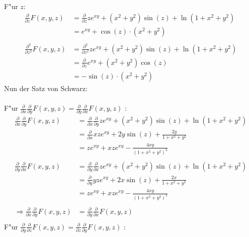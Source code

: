 \documentclass{theozettel}
\begin{document}
F"ur $z$:\\
\begin{align*}
\frac{\partial}{\partial z}F\left(x,y,z\right) &=\frac{\partial}{\partial z}ze^{xy}+\left(x^2+y^2\right)\sin\left(z\right)+\ln\left(1+x^2+y^2\right)\\
&=e^{xy}+\cos\left(z\right)\cdot\left(x^2+y^2\right)\\\\
\frac{\partial^2}{\partial z^2}F\left(x,y,z\right) &=\frac{\partial^2}{\partial z^2}ze^{xy}+\left(x^2+y^2\right)\sin\left(z\right)+\ln\left(1+x^2+y^2\right)\\
&=\frac{\partial}{\partial z}e^{xy}+\left(x^2+y^2\right)\cos\left(z\right)\\
&= -\sin\left(z\right) \cdot \left(x^2+y^2\right)
\end{align*}
Nun der Satz von Schwarz:\\\\
F"ur $\frac{\partial}{\partial x}\frac{\partial}{\partial y}F\left(x,y,z\right) =\frac{\partial}{\partial y}\frac{\partial}{\partial x}F\left(x,y,z\right)$ :
\begin{align*}
\frac{\partial}{\partial x}\frac{\partial}{\partial y}F\left(x,y,z\right) &= \frac{\partial}{\partial x}\frac{\partial}{\partial y}ze^{xy}+\left(x^2+y^2\right)\sin\left(z\right)+\ln\left(1+x^2+y^2\right)\\
&=\frac{\partial}{\partial x}xze^{xy}+2y\sin\left(z\right)+\frac{2y}{1+x^2+y^2}\\
&= ze^{xy}+xze^{xy}-\frac{4xy}{\left(1+x^2+y^2\right)^2}\\\\
\frac{\partial}{\partial y}\frac{\partial}{\partial x}F\left(x,y,z\right) &= \frac{\partial}{\partial y}\frac{\partial}{\partial x}ze^{xy}+\left(x^2+y^2\right)\sin\left(z\right)+\ln\left(1+x^2+y^2\right)\\
&= \frac{\partial}{\partial y}yze^{xy}+2x\sin\left(z\right)+\frac{2x}{1+x^2+y^2}\\
&= ze^{xy}+xze^{xy}-\frac{4xy}{\left(1+x^2+y^2\right)^2}\\\\
\Rightarrow \frac{\partial}{\partial x}\frac{\partial}{\partial y}F\left(x,y,z\right) &=\frac{\partial}{\partial y}\frac{\partial}{\partial x}F\left(x,y,z\right)\\
\end{align*}
F"ur $\frac{\partial}{\partial y}\frac{\partial}{\partial z}F\left(x,y,z\right) =\frac{\partial}{\partial z}\frac{\partial}{\partial y}F\left(x,y,z\right)$ :
\end{document}
